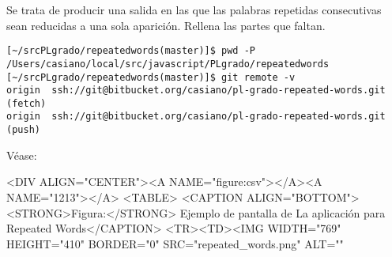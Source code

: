 
Se trata de producir una salida en las que las palabras repetidas consecutivas sean reducidas a una sola aparición.
Rellena las partes que faltan.


\begin{verbatim}
[~/srcPLgrado/repeatedwords(master)]$ pwd -P
/Users/casiano/local/src/javascript/PLgrado/repeatedwords
[~/srcPLgrado/repeatedwords(master)]$ git remote -v
origin  ssh://git@bitbucket.org/casiano/pl-grado-repeated-words.git (fetch)
origin  ssh://git@bitbucket.org/casiano/pl-grado-repeated-words.git (push)
\end{verbatim}

Véase:




\begin{rawhtml}
<DIV ALIGN="CENTER"><A NAME="figure:csv"></A><A NAME="1213"></A>
<TABLE>
<CAPTION ALIGN="BOTTOM"><STRONG>Figura:</STRONG>
Ejemplo de pantalla de La aplicación para Repeated Words</CAPTION>
<TR><TD><IMG
 WIDTH="769" HEIGHT="410" BORDER="0"
 SRC="repeated_words.png"
 ALT=""
\end{rawhtml}



